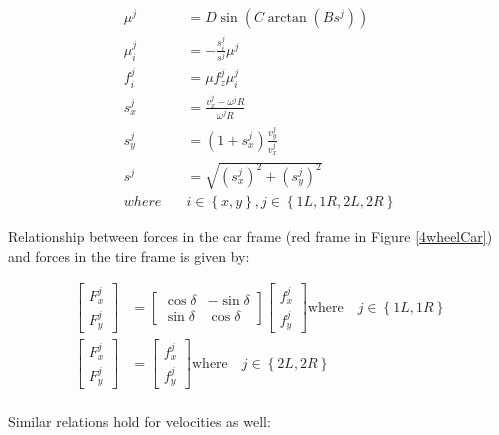 \documentclass[paper=a4, fontsize=11pt]{scrartcl} %
\numberwithin{equation}{section} %
\numberwithin{figure}{section} %
\numberwithin{table}{section} %
\begin{document}
\begin{align}
\mu^j & =D\sin(C\arctan(Bs^j)) \label{4wheelPacejkaEq1}  \\
\mu_i^j & = -\frac{s_i^j}{s^j}\mu^j   \\
f_i^j & = \mu f_{z}^j \mu_i^j \label{lateralLongitudinal}  \\
s_x^j & = \frac{v_x^j - \omega^jR}{\omega^jR}   \\
s_y^j & = \left( 1 + s_x^j\right) \frac{v_y^j}{v_x^j}  \\ 
s^j & = \sqrt{ (s_x^j)^2 + (s_y^j)^2 }   \\
where \quad &  i \in\left\{ {x, y}\right\}, j \in \left\{ {1L,1R,2L, 2R}\right\} \label{4wheelPacejkaEq6}
\end{align}

Relationship between forces in the car frame (red frame in Figure \ref{4wheelCar}) and forces in the tire frame is given by:

\begin{align}
\begin{bmatrix}
F^j_x  \label{forcesConversion1}\\
F^j_y
\end{bmatrix} & = \begin{bmatrix}
\cos\delta & -\sin\delta \\
\sin\delta & \cos\delta
\end{bmatrix} \begin{bmatrix}
f^j_x \\
f^j_y
\end{bmatrix}
\text{where}  \quad j \in \left\{ {1L,1R}\right\} \\
\begin{bmatrix}
F^j_x \\
F^j_y
\end{bmatrix} & = \begin{bmatrix}
f^j_x \\
f^j_y
\end{bmatrix}
\text{where}  \quad j \in \left\{ {2L,2R}\right\} \label{forcesConversion3} \\
\end{align}

Similar relations hold for velocities as well:
\end{document}
